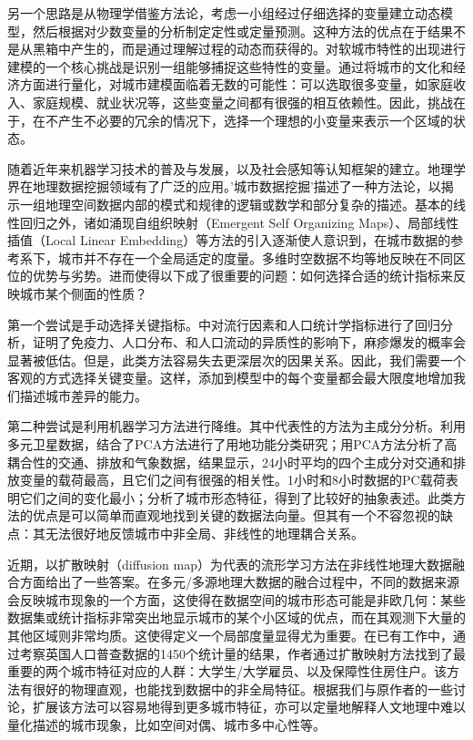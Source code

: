 另一个思路是从物理学借鉴方法论，考虑一小组经过仔细选择的变量建立动态模型，然后根据对少数变量的分析制定定性或定量预测。这种方法的优点在于结果不是从黑箱中产生的，而是通过理解过程的动态而获得的。对软城市特性的出现进行建模的一个核心挑战是识别一组能够捕捉这些特性的变量。通过将城市的文化和经济方面进行量化，对城市建模面临着无数的可能性：可以选取很多变量，如家庭收入、家庭规模、就业状况等，这些变量之间都有很强的相互依赖性。因此，挑战在于，在不产生不必要的冗余的情况下，选择一个理想的小变量来表示一个区域的状态。

随着近年来机器学习技术的普及与发展，以及社会感知等认知框架的建立。地理学界在地理数据挖掘领域有了广泛的应用。'城市数据挖掘'描述了一种方法论，以揭示一组地理空间数据内部的模式和规律的逻辑或数学和部分复杂的描述\cite{behnisch2009urban, bendimerad2016unsupervised}。基本的线性回归之外，诸如涌现自组织映射（Emergent Self Organizing Maps）、局部线性插值（Local Linear Embedding）等方法的引入逐渐使人意识到，在城市数据的参考系下，城市并不存在一个全局适定的度量。多维时空数据不均等地反映在不同区位的优势与劣势。进而使得以下成了很重要的问题：如何选择合适的统计指标来反映城市某个侧面的性质？

第一个尝试是手动选择关键指标。\cite{bosetti2020heterogeneity}中对流行因素和人口统计学指标进行了回归分析，证明了免疫力、人口分布、和人口流动的异质性的影响下，麻疹爆发的概率会显著被低估。但是，此类方法容易失去更深层次的因果关系。因此，我们需要一个客观的方式选择关键变量。这样，添加到模型中的每个变量都会最大限度地增加我们描述城市差异的能力。


第二种尝试是利用机器学习方法进行降维。其中代表性的方法为主成分分析。\cite{deng2008pca}利用多元卫星数据，结合了PCA方法进行了用地功能分类研究；\cite{nagendra2003principal}用PCA方法分析了高耦合性的交通、排放和气象数据，结果显示，24小时平均的四个主成分对交通和排放变量的载荷最高，且它们之间有很强的相关性。1小时和8小时数据的PC载荷表明它们之间的变化最小；\cite{palmason2005classification}分析了城市形态特征，得到了比较好的抽象表述。此类方法的优点是可以简单而直观地找到关键的数据法向量。但其有一个不容忽视的缺点：其无法很好地反馈城市中非全局、非线性的地理耦合关系。

近期，以扩散映射（diffusion map）\cite{barter2019manifold}为代表的流形学习方法在非线性地理大数据融合方面给出了一些答案。在多元/多源地理大数据的融合过程中，不同的数据来源会反映城市现象的一个方面，这使得在数据空间的城市形态可能是非欧几何：某些数据集或统计指标非常突出地显示城市的某个小区域的优点，而在其观测下大量的其他区域则非常均质。这使得定义一个局部度量显得尤为重要。在已有工作\cite{barter2019manifold}中，通过考察英国人口普查数据的1450个统计量的结果，作者通过扩散映射方法找到了最重要的两个城市特征对应的人群：大学生/大学雇员、以及保障性住房住户。该方法有很好的物理直观，也能找到数据中的非全局特征。根据我们与原作者的一些讨论，扩展该方法可以容易地得到更多城市特征，亦可以定量地解释人文地理中难以量化描述的城市现象，比如空间对偶\cite{lomi2000density}、城市多中心性等\cite{gordon1986distribution, mcmillen1997nonparametric}。


